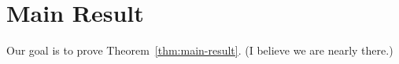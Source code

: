 

\section{Main Result}
Our goal is to prove Theorem~\ref{thm:main-result}. 
(I believe we are nearly there.)

